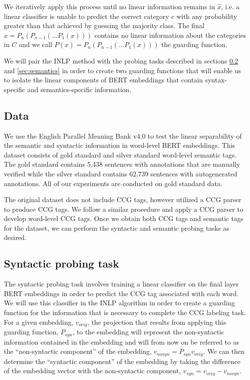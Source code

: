 \documentclass[11pt,a4paper]{article}
\begin{document}
We iteratively apply this process until no linear information remains in $\hat{x}$, i.e. a linear classifier is unable to predict the correct category $c$ with any probability greater than that achieved by guessing the majority class. The final $\hat{x} = P_n(P_{n-1}(\dots P_1(x)))$ contains no linear information about the categories in $C$ and we call $P(x) = P_n(P_{n-1}(\dots P_1(x)))$ the guarding function. 

We will pair the INLP method with the probing tasks described in sections \ref{sec:syntactic} and \ref{sec:semantics} in order to create two guarding functions that will enable us to isolate the linear components of BERT embeddings that contain syntax-specific and semantics-specific information. 


\subsection{Data}
\label{sec:data}

We use the English Parallel Meaning Bank v4.0 \citep{pmbData} to test the linear separability of the semantic and syntactic information in word-level BERT embeddings. This dataset consists of gold standard and silver standard word-level semantic tags. The gold standard contains 5,438 sentences with annotations that are manually verified while the silver standard contains 62,739 sentences with autogenerated annotations. All of our experiments are conducted on gold standard data. 

The original dataset does not include CCG tags, however \citealp{pmbData} utilized a CCG parser to produce CCG tags. We follow a similar procedure and apply a CCG parser \citep{ccg_tagger} to develop word-level CCG tags. Once we obtain both CCG tags and semantic tags for the dataset, we can perform the syntactic and semantic probing tasks as desired.


\subsection{Syntactic probing task}
\label{sec:syntactic}

The syntactic probing task involves training a linear classifier on the final layer BERT embeddings in order to predict the CCG tag associated with each word. We will use this classifier in the INLP algorithm in order to create a guarding function for the information that is necessary to complete the CCG labeling task. For a given embedding, $v_{orig}$, the projection that results from applying this guarding function, $P_{syn}$, to the embedding will represent the non-syntactic information contained in the embedding and will from now on be referred to as the ``non-syntactic component'' of the embedding, $v_{no syn} = P_{syn} v_{orig}$. We can then determine the ``syntactic component'' of the embedding by taking the difference of the embedding vector with the non-syntactic component, $v_{syn} = v_{orig} - v_{no syn}$.
\end{document}
